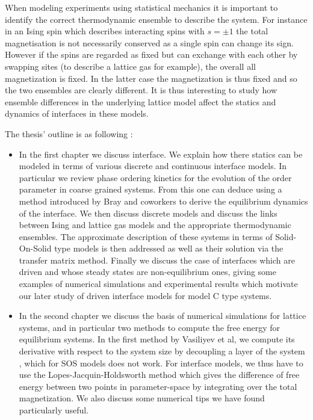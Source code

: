 When modeling experiments using statistical mechanics it is important to identify the correct thermodynamic ensemble to describe the system. For instance in an Ising spin which describes interacting spins with $s=\pm 1$ the total magnetisation is not necessarily conserved as a single spin can change its sign. However if the spins are regarded as fixed but can exchange with each other by swapping sites (to describe a lattice gas for example), the overall all magnetization is fixed. In the latter case the magnetization is thus fixed and so the two ensembles are clearly different. It is thus interesting to study how ensemble differences in the underlying lattice model affect the statics and dynamics of interfaces in these models.


The thesis' outline is as following :
\begin{itemize}
    \item In the first chapter we discuss interface. We explain how there statics can be modeled in terms of various discrete and continuous interface models. In particular we review phase ordering kinetics for the evolution of the order parameter in coarse grained systems. From this one can deduce using a method introduced by Bray and coworkers \cite{bray_interface_2001} to derive the equilibrium dynamics of the interface. We then discuss discrete models and discuss the links between Ising and lattice gas models and the appropriate thermodynamic ensembles. The approximate description of these systems in terms of Solid-On-Solid type models is then addressed as well as their solution via the transfer matrix method. Finally we discuss the case of interfaces which are driven and whose steady states are non-equilibrium ones, giving some examples of numerical simulations and experimental results which motivate our later study of driven interface models for model C type systems.
    \item In the second chapter we discuss the basis of numerical simulations \cite{newman_monte_1999} for lattice systems, and in particular two methods to compute the free energy for equilibrium systems. In the first method by Vasiliyev et al, we compute its derivative with respect to the system size by decoupling a layer of the system \cite{vasilyev_universal_2009}, which for SOS models does not work. For interface models, we thus have to use the Lopes-Jacquin-Holdsworth method \cite{lopes_cardozo_critical_2014} which gives the difference of free energy between two points in parameter-space by integrating over the total magnetization. We also discuss some numerical tips we have found particularly useful.

\end{itemize}
